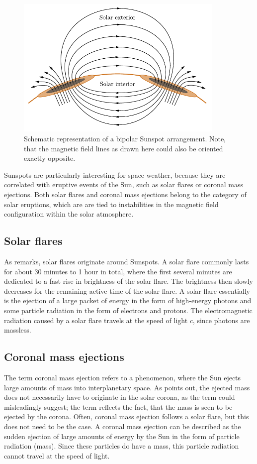 \documentclass[a4paper,12pt]{report}
\begin{document}
\begin{figure}[h]
\centering
\includegraphics[width=10cm]{figures/bipolarSunspots.pdf}
\caption{Schematic representation of a bipolar Sunspot arrangement. Note, that the magnetic field lines as drawn here could also be oriented exactly opposite.}
\label{fig:bipolarSunspots}
\end{figure}
Sunspots are particularly interesting for space weather, because they are correlated with eruptive events of the Sun, such as solar flares or coronal mass ejections. Both solar flares and coronal mass ejections belong to the category of solar eruptions, which are are tied to instabilities in the magnetic field configuration within the solar atmosphere.

\subsection{Solar flares}
As \cite[p.432]{Stix.2002} remarks, solar flares originate around Sunspots. A solar flare commonly lasts for about 30 minutes to 1 hour in total, where the first several minutes are dedicated to a fast rise in brightness of the solar flare. The brightness then slowly decreases for the remaining active time of the solar flare. A solar flare essentially is the ejection of a large packet of energy in the form of high-energy photons and some particle radiation in the form of electrons and protons. The electromagnetic radiation caused by a solar flare travels at the speed of light $c$, since photons are massless.

\subsection{Coronal mass ejections}
The term coronal mass ejection refers to a phenomenon, where the Sun ejects large amounts of mass into interplanetary space. As \cite[p.436]{Stix.2002} points out, the ejected mass does not necessarily have to originate in the solar corona, as the term could misleadingly suggest; the term reflects the fact, that the mass is seen to be ejected by the corona. Often, coronal mass ejection follows a solar flare, but this does not need to be the case. A coronal mass ejection can be described as the sudden ejection of large amounts of energy by the Sun in the form of particle radiation (mass). Since these particles do have a mass, this particle radiation cannot travel at the speed of light.
\end{document}

